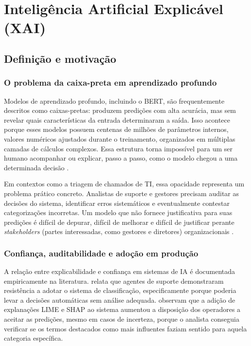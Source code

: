 \documentclass[
    12pt,                %
    openright,           %
    oneside,             %
    a4paper,             %
    english,             %
    brazil               %
]{abntex2}
\begin{document}
\section{Inteligência Artificial Explicável (XAI)}
\label{sec:xai}

\subsection{Definição e motivação}
\label{subsec:xai_definicao}

\subsubsection{O problema da caixa-preta em aprendizado profundo}
\label{subsubsec:xai_caixapreta}

Modelos de aprendizado profundo, incluindo o BERT, são frequentemente descritos como caixas-pretas: produzem predições com alta acurácia, mas sem revelar quais características da entrada determinaram a saída. Isso acontece porque esses modelos possuem centenas de milhões de 
parâmetros internos, valores numéricos ajustados durante o 
treinamento, organizados em múltiplas camadas de cálculos complexos. 
Essa estrutura torna impossível para um ser humano acompanhar ou 
explicar, passo a passo, como o modelo chegou a uma determinada 
decisão \cite{salih2023}.

Em contextos como a triagem de chamados de TI, essa opacidade representa um problema prático concreto. Analistas de suporte e gestores precisam auditar as decisões do sistema, identificar erros sistemáticos e eventualmente contestar categorizações incorretas. Um modelo que não fornece justificativa para suas predições é difícil de depurar, difícil de melhorar e difícil de justificar perante \textit{stakeholders} (partes interessadas, como gestores e diretores) organizacionais \cite{zemp2021}.

\subsubsection{Confiança, auditabilidade e adoção em produção}
\label{subsubsec:xai_confianca}

A relação entre explicabilidade e confiança em sistemas de IA é documentada empiricamente na literatura.  relata que agentes de suporte demonstraram resistência a adotar o sistema de classificação, especificamente porque poderia levar a decisões automáticas sem análise adequada.  observam que a adição de explanações LIME e SHAP ao sistema aumentou a disposição dos operadores a aceitar as predições, mesmo em casos de incerteza, porque o analista conseguia verificar se os termos destacados como mais influentes faziam sentido para aquela categoria específica.
\end{document}
